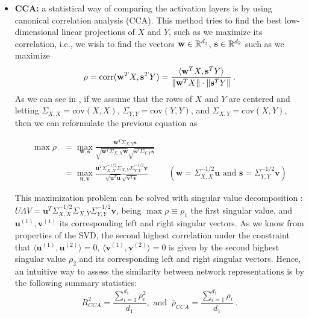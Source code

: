 \documentclass[../main.tex]{subfiles}
\begin{document}
\begin{itemize}
    \item \textbf{CCA:} a statistical way of comparing the activation layers is by using canonical correlation analysis (CCA). This method tries to find the best low-dimensional linear projections of $X$ and $Y$, such as we maximize its correlation, i.e., we wish to find the vectors $\mathbf{w} \in \mathbb{R}^{d_1}$, $\mathbf{s} \in \mathbb{R}^{d_2}$ such as we maximize
    \[
    \rho = \text{corr}(\mathbf{w}^T X, \mathbf{s}^T Y ) = \frac{\langle \mathbf{w}^T X, \mathbf{s}^T Y \rangle}{\left\lVert \mathbf{w}^T X \right\rVert \cdot \left\lVert \mathbf{s}^T Y \right\rVert}\,.
    \]
    As we can see in \cite{morcos_insights_2018}, if we assume that the rows of $X$ and $Y$ are centered and letting $\Sigma_{X, X}= \text{cov}(X,X)$, $\Sigma_{Y, Y}= \text{cov}(Y,Y)$, and $\Sigma_{X, Y}= \text{cov}(X, Y)$, then we can reformulate the previous equation as

    \begin{align*}
    \max \rho &= \max_{\mathbf{w, s}} \frac{\mathbf{w}^T \Sigma_{X,Y} \mathbf{s}}{\sqrt{\mathbf{w}^T \Sigma_{X, X} \mathbf{w}} \sqrt{\mathbf{s}^T \Sigma_{Y, Y} \mathbf{s}}}\\
    &= \max_{\mathbf{u, v}} \frac{\mathbf{u}^T \Sigma_{X,X}^{-1/2} \Sigma_{X,Y} \Sigma_{Y,Y}^{-1/2} \mathbf{v}}{\sqrt{\mathbf{u}^T \mathbf{u}} \sqrt{\mathbf{v}^T \mathbf{v}}} && \left( \mathbf{w}= \Sigma_{X,X}^{-1/2} \mathbf{u} \text{ and } \mathbf{s} =  \Sigma_{Y,Y}^{-1/2} \mathbf{v} \right) 
    \end{align*}

    This maximization problem can be solved with singular value decomposition \cite{morcos_insights_2018}: $U \Lambda V =  \mathbf{u}^T \Sigma_{X,X}^{-1/2} \Sigma_{X,Y} \Sigma_{Y,Y}^{-1/2} \mathbf{v}$, being $\max \rho \equiv \rho_1$ the first singular value, and $\mathbf{u}^{(1)}, \mathbf{v}^{(1)}$ its corresponding left and right singular vectors. As we know from properties of the SVD, the second highest correlation under the constraint that $\langle \mathbf{u}^{(1)}, \mathbf{u}^{(2)} \rangle=0$, $\langle \mathbf{v}^{(1)}, \mathbf{v}^{(2)} \rangle=0$ is given by the second highest singular value $\rho_2$ and its corresponding left and right singular vectors. Hence, an intuitive way to assess the similarity between network representations is by the following summary statistics:
    \[
        R_{CCA}^2 = \frac{\sum_{i=1}^{d_1}\rho_i^2}{d_1},\text{ and }\ 
        \bar{\rho}_{CCA} = \frac{\sum_{i=1}^{d_1}\rho_i}{d_1}\,.
    \]



\end{itemize}
\end{document}

